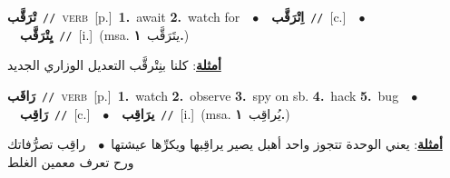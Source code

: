\documentclass[10pt,a4paper,twoside]{article} %
\begin{document}
\begin{multicols}{2}
{\setlength\topsep{0pt}\textbf{\foreignlanguage{arabic}{تْرَقَّب}}\ {\color{gray}\texttt{//}\color{black}}\ \textsc{verb}\ [p.]\ \textbf{1.}~await  \textbf{2.}~watch for\ \ $\bullet$\ \ \setlength\topsep{0pt}\textbf{\foreignlanguage{arabic}{اِتْرَقَّب}}\ {\color{gray}\texttt{//}\color{black}}\ [c.]\ \ $\bullet$\ \ \setlength\topsep{0pt}\textbf{\foreignlanguage{arabic}{يِتْرَقَّب}}\ {\color{gray}\texttt{//}\color{black}}\ [i.]\ \color{gray}(msa. \foreignlanguage{arabic}{يتَرَقَّب}~\foreignlanguage{arabic}{\textbf{١.}})\color{black}\  \begin{flushright}\color{gray}\foreignlanguage{arabic}{\textbf{\underline{\foreignlanguage{arabic}{أمثلة}}}: كلنا بنِتْرقَّب التعديل الوزاري الجديد}\end{flushright}\color{black}} \vspace{2mm}

{\setlength\topsep{0pt}\textbf{\foreignlanguage{arabic}{رَاقَب}}\ {\color{gray}\texttt{//}\color{black}}\ \textsc{verb}\ [p.]\ \textbf{1.}~watch  \textbf{2.}~observe  \textbf{3.}~spy on sb.  \textbf{4.}~hack  \textbf{5.}~bug\ \ $\bullet$\ \ \setlength\topsep{0pt}\textbf{\foreignlanguage{arabic}{رَاقِب}}\ {\color{gray}\texttt{//}\color{black}}\ [c.]\ \ $\bullet$\ \ \setlength\topsep{0pt}\textbf{\foreignlanguage{arabic}{يرَاقِب}}\ {\color{gray}\texttt{//}\color{black}}\ [i.]\ \color{gray}(msa. \foreignlanguage{arabic}{يُراقِب}~\foreignlanguage{arabic}{\textbf{١.}})\color{black}\  \begin{flushright}\color{gray}\foreignlanguage{arabic}{\textbf{\underline{\foreignlanguage{arabic}{أمثلة}}}: يعني الوحدة تتجوز واحد أهبل يصير يراقِبها ويكرِّها عيشتها\ $\bullet$\ \  راقِب تصرُّفاتك ورح تعرف معمين الغلط}\end{flushright}\color{black}} \vspace{2mm}


\end{multicols}
\end{document}
